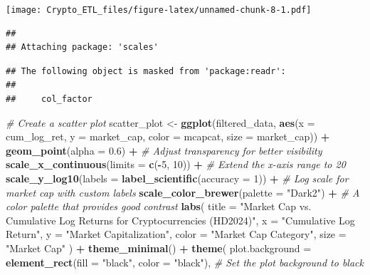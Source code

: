 \documentclass[
]{article}
\newenvironment{Shaded}{\begin{snugshade}}{\end{snugshade}}
\newcommand{\AttributeTok}[1]{\textcolor[rgb]{0.13,0.29,0.53}{#1}}
\newcommand{\CommentTok}[1]{\textcolor[rgb]{0.56,0.35,0.01}{\textit{#1}}}
\newcommand{\DecValTok}[1]{\textcolor[rgb]{0.00,0.00,0.81}{#1}}
\newcommand{\FloatTok}[1]{\textcolor[rgb]{0.00,0.00,0.81}{#1}}
\newcommand{\FunctionTok}[1]{\textcolor[rgb]{0.13,0.29,0.53}{\textbf{#1}}}
\newcommand{\NormalTok}[1]{#1}
\newcommand{\OtherTok}[1]{\textcolor[rgb]{0.56,0.35,0.01}{#1}}
\newcommand{\SpecialCharTok}[1]{\textcolor[rgb]{0.81,0.36,0.00}{\textbf{#1}}}
\newcommand{\StringTok}[1]{\textcolor[rgb]{0.31,0.60,0.02}{#1}}
\begin{document}
\texttt{[image: Crypto\_ETL\_files/figure-latex/unnamed-chunk-8-1.pdf]}

\begin{verbatim}
## 
## Attaching package: 'scales'
\end{verbatim}

\begin{verbatim}
## The following object is masked from 'package:readr':
## 
##     col_factor
\end{verbatim}

\begin{Shaded}
\begin{Highlighting}[]
\CommentTok{\# Create a scatter plot}
\NormalTok{scatter\_plot }\OtherTok{\textless{}{-}} \FunctionTok{ggplot}\NormalTok{(filtered\_data, }\FunctionTok{aes}\NormalTok{(}\AttributeTok{x =}\NormalTok{ cum\_log\_ret, }\AttributeTok{y =}\NormalTok{ market\_cap, }\AttributeTok{color =}\NormalTok{ mcapcat, }\AttributeTok{size =}\NormalTok{ market\_cap)) }\SpecialCharTok{+}
  \FunctionTok{geom\_point}\NormalTok{(}\AttributeTok{alpha =} \FloatTok{0.6}\NormalTok{) }\SpecialCharTok{+}  \CommentTok{\# Adjust transparency for better visibility}
  \FunctionTok{scale\_x\_continuous}\NormalTok{(}\AttributeTok{limits =} \FunctionTok{c}\NormalTok{(}\SpecialCharTok{{-}}\DecValTok{5}\NormalTok{, }\DecValTok{10}\NormalTok{)) }\SpecialCharTok{+}  \CommentTok{\# Extend the x{-}axis range to 20}
  \FunctionTok{scale\_y\_log10}\NormalTok{(}\AttributeTok{labels =} \FunctionTok{label\_scientific}\NormalTok{(}\AttributeTok{accuracy =} \DecValTok{1}\NormalTok{)) }\SpecialCharTok{+}  \CommentTok{\# Log scale for market cap with custom labels}
  \FunctionTok{scale\_color\_brewer}\NormalTok{(}\AttributeTok{palette =} \StringTok{"Dark2"}\NormalTok{) }\SpecialCharTok{+}  \CommentTok{\# A color palette that provides good contrast}
  \FunctionTok{labs}\NormalTok{(}
    \AttributeTok{title =} \StringTok{"Market Cap vs. Cumulative Log Returns for Cryptocurrencies (HD2024)"}\NormalTok{,}
    \AttributeTok{x =} \StringTok{"Cumulative Log Return"}\NormalTok{,}
    \AttributeTok{y =} \StringTok{"Market Capitalization"}\NormalTok{,}
    \AttributeTok{color =} \StringTok{"Market Cap Category"}\NormalTok{,}
    \AttributeTok{size =} \StringTok{"Market Cap"}
\NormalTok{  ) }\SpecialCharTok{+}
  \FunctionTok{theme\_minimal}\NormalTok{() }\SpecialCharTok{+}
  \FunctionTok{theme}\NormalTok{(}
    \AttributeTok{plot.background =} \FunctionTok{element\_rect}\NormalTok{(}\AttributeTok{fill =} \StringTok{"black"}\NormalTok{, }\AttributeTok{color =} \StringTok{"black"}\NormalTok{), }\CommentTok{\# Set the plot background to black}

\end{Highlighting}
\end{Shaded}
\end{document}
